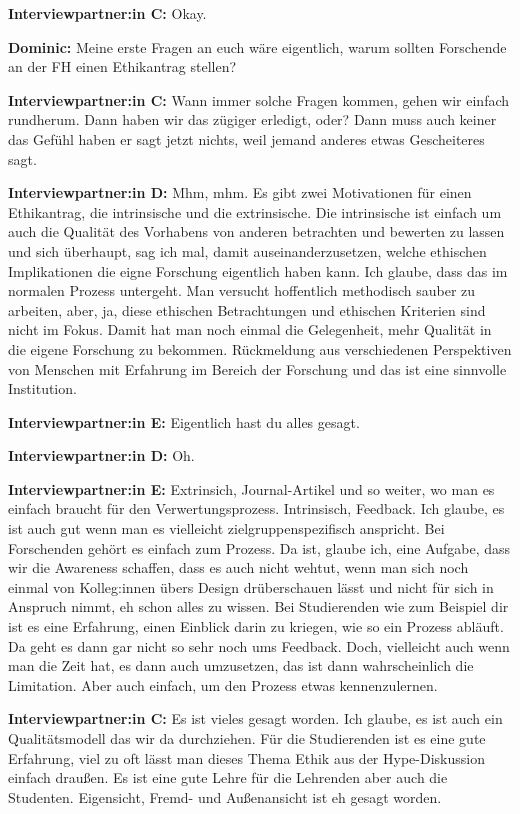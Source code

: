 \documentclass[a4paper,12pt,twoside]{scrreprt}
\begin{document}
\textbf{Interviewpartner:in C:} Okay.

\textbf{Dominic:} Meine erste Fragen an euch wäre eigentlich, warum sollten Forschende an der FH einen Ethikantrag stellen?

\textbf{Interviewpartner:in C:} Wann immer solche Fragen kommen, gehen wir einfach rundherum. Dann haben wir das zügiger erledigt, oder? Dann muss auch keiner das Gefühl haben er sagt jetzt nichts, weil jemand anderes etwas Gescheiteres sagt.

\textbf{Interviewpartner:in D:} Mhm, mhm. Es gibt zwei Motivationen für einen Ethikantrag, die intrinsische und die extrinsische. Die intrinsische ist einfach um auch die Qualität des Vorhabens von anderen betrachten und bewerten zu lassen und sich überhaupt, sag ich mal, damit auseinanderzusetzen, welche ethischen Implikationen die eigne Forschung eigentlich haben kann. Ich glaube, dass das im normalen Prozess untergeht. Man versucht hoffentlich methodisch sauber zu arbeiten, aber, ja, diese ethischen Betrachtungen und ethischen Kriterien sind nicht im Fokus. Damit hat man noch einmal die Gelegenheit, mehr Qualität in die eigene Forschung zu bekommen. Rückmeldung aus verschiedenen Perspektiven von Menschen mit Erfahrung im Bereich der Forschung und das ist eine sinnvolle Institution.

\textbf{Interviewpartner:in E:} Eigentlich hast du alles gesagt.

\textbf{Interviewpartner:in D:} Oh.

\textbf{Interviewpartner:in E:} Extrinsich, Journal-Artikel und so weiter, wo man es einfach braucht für den Verwertungsprozess. Intrinsisch, Feedback. Ich glaube, es ist auch gut wenn man es vielleicht zielgruppenspezifisch anspricht. Bei Forschenden gehört es einfach zum Prozess. Da ist, glaube ich, eine Aufgabe, dass wir die Awareness schaffen, dass es auch nicht wehtut, wenn man sich noch einmal von Kolleg:innen übers Design drüberschauen lässt und nicht für sich in Anspruch nimmt, eh schon alles zu wissen. Bei Studierenden wie zum Beispiel dir ist es eine Erfahrung, einen Einblick darin zu kriegen, wie so ein Prozess abläuft. Da geht es dann gar nicht so sehr noch ums Feedback. Doch, vielleicht auch wenn man die Zeit hat, es dann auch umzusetzen, das ist dann wahrscheinlich die Limitation. Aber auch einfach, um den Prozess etwas kennenzulernen.

\textbf{Interviewpartner:in C:} Es ist vieles gesagt worden. Ich glaube, es ist auch ein Qualitätsmodell das wir da durchziehen. Für die Studierenden ist es eine gute Erfahrung, viel zu oft lässt man dieses Thema Ethik aus der Hype-Diskussion einfach draußen. Es ist eine gute Lehre für die Lehrenden aber auch die Studenten. Eigensicht, Fremd- und Außenansicht ist eh gesagt worden.
\end{document}
